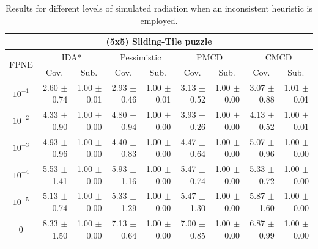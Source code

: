 \documentclass[letterpaper]{article}
\begin{document}
\begin{table}[t]
\centering
\setlength{\tabcolsep}{5 pt}
\begin{adjustbox}{width=0.65\columnwidth}
\begin{tabular}{| c | r  r | r  r | r  r | r  r |}
\hline
\multicolumn{9}{|c|}{\textbf{(5x5) Sliding-Tile puzzle}} \\
\hline
\multirow{2}{*}{FPNE}	& \multicolumn{2}{|c|}{IDA*} 	& \multicolumn{2}{|c|}{Pessimistic} 	& \multicolumn{2}{|c|}{PMCD} 	& \multicolumn{2}{|c|}{CMCD} 	\\
\cline{2-9}
& \multicolumn{1}{c}{Cov.} & \multicolumn{1}{c|}{Sub.} 	& \multicolumn{1}{c}{Cov.} & \multicolumn{1}{c|}{Sub.} 	& \multicolumn{1}{c}{Cov.} & \multicolumn{1}{c|}{Sub.} 	& \multicolumn{1}{c}{Cov.} & \multicolumn{1}{c|}{Sub.} 	\\
\hline
$10^{-1}$	 & 2.60 $\pm$ 0.74	 & 1.00 $\pm$ 0.01	 & 2.93 $\pm$ 0.46	 & 1.00 $\pm$ 0.01	 & 3.13 $\pm$ 0.52	 & 1.00 $\pm$ 0.00	 & 3.07 $\pm$ 0.88	 & 1.01 $\pm$ 0.01	\\
$10^{-2}$	 & 4.33 $\pm$ 0.90	 & 1.00 $\pm$ 0.00	 & 4.80 $\pm$ 0.94	 & 1.00 $\pm$ 0.00	 & 3.93 $\pm$ 0.26	 & 1.00 $\pm$ 0.00	 & 4.13 $\pm$ 0.52	 & 1.00 $\pm$ 0.01	\\
$10^{-3}$	 & 4.93 $\pm$ 0.96	 & 1.00 $\pm$ 0.00	 & 4.40 $\pm$ 0.83	 & 1.00 $\pm$ 0.00	 & 4.47 $\pm$ 0.64	 & 1.00 $\pm$ 0.00	 & 5.07 $\pm$ 0.96	 & 1.00 $\pm$ 0.00	\\
$10^{-4}$	 & 5.53 $\pm$ 1.41	 & 1.00 $\pm$ 0.00	 & 5.93 $\pm$ 1.16	 & 1.00 $\pm$ 0.00	 & 5.47 $\pm$ 0.74	 & 1.00 $\pm$ 0.00	 & 5.33 $\pm$ 0.72	 & 1.00 $\pm$ 0.00	\\
$10^{-5}$	 & 5.13 $\pm$ 0.74	 & 1.00 $\pm$ 0.00	 & 5.33 $\pm$ 1.29	 & 1.00 $\pm$ 0.00	 & 5.47 $\pm$ 1.30	 & 1.00 $\pm$ 0.00	 & 5.87 $\pm$ 1.60	 & 1.00 $\pm$ 0.00	\\
0 	 & 8.33 $\pm$ 1.50	 & 1.00 $\pm$ 0.00 	 & 7.13 $\pm$ 0.64	 & 1.00 $\pm$ 0.00 	 & 7.00 $\pm$ 0.85	 & 1.00 $\pm$ 0.00 	 & 6.87 $\pm$ 0.99	 & 1.00 $\pm$ 0.00 	\\
\hline
\end{tabular}
\end{adjustbox}
\caption{Results for different levels of simulated radiation when an inconsistent heuristic is employed.}
\label{tab:24puzzle}
\end{table}
\end{document}
